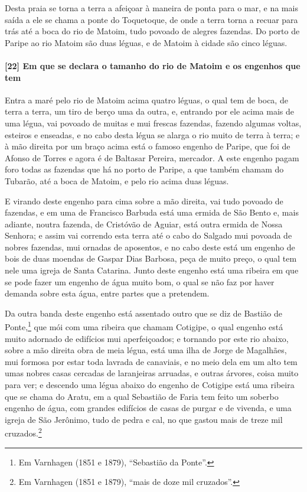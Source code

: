 \begin{linenumbers}
Desta praia se torna a terra a afeiçoar à maneira de ponta para o mar, e na mais saída a
ele se chama a ponte do Toquetoque, de onde a terra torna a recuar para trás até a boca do
rio de Matoim, tudo povoado de alegres fazendas. Do porto de Paripe ao rio Matoim são duas
léguas, e de Matoim à cidade são cinco léguas.

\paragraph{[22] Em que se declara o tamanho do rio de Matoim e os engenhos que tem}\quad
Entra a maré pelo rio de Matoim acima quatro léguas, o qual tem de boca, de terra a terra,
um tiro de berço uma da outra, e, entrando por ele acima mais de uma légua, vai povoado de
muitas e mui frescas fazendas, fazendo algumas voltas, esteiros e enseadas, e no cabo
desta légua se alarga o rio muito de terra à terra; e à mão direita por um braço acima
está o famoso engenho de Paripe, que foi de Afonso de Torres e agora é de Baltasar
Pereira, mercador. A este engenho pagam foro todas as fazendas que há no porto de Paripe,
a que também chamam do Tubarão, até a boca de Matoim, e pelo rio acima duas léguas.

E virando deste engenho para cima sobre a mão direita, vai tudo povoado de fazendas, e em
uma de Francisco Barbuda está uma ermida de São Bento e, mais adiante, noutra fazenda, de
Cristóvão de Aguiar, está outra ermida de Nossa Senhora; e assim vai correndo esta terra
até o cabo do Salgado mui povoada de nobres fazendas, mui ornadas de aposentos, e no cabo
deste está um engenho de bois de duas moendas de Gaspar Dias Barbosa, peça de muito preço,
o qual tem nele uma igreja de Santa Catarina. Junto deste engenho está uma ribeira em que
se pode fazer um engenho de água muito bom, o qual se não faz por haver demanda sobre esta
água, entre partes que a pretendem.

Da outra banda deste engenho está assentado outro que se diz de Bastião de
Ponte,\footnote{ Em Varnhagen (1851 e 1879), ``Sebastião da Ponte''.} que mói com uma
ribeira que chamam Cotigipe, o qual engenho está muito adornado de edifícios mui
aperfeiçoados; e tornando por este rio abaixo, sobre a mão direita obra de meia légua,
está uma ilha de Jorge de Magalhães, mui formosa por estar toda lavrada de canaviais, e no
meio dela em um alto tem umas nobres casas cercadas de laranjeiras arruadas, e outras
árvores, coisa muito para ver; e descendo uma légua abaixo do engenho de Cotigipe está uma
ribeira que se chama do Aratu, em a qual Sebastião de Faria tem feito um soberbo engenho
de água, com grandes edifícios de casas de purgar e de vivenda, e uma igreja de São
Jerônimo, tudo de pedra e cal, no que gastou mais de treze mil cruzados.\footnote{ Em
Varnhagen (1851 e 1879), ``mais de doze mil cruzados''.}


\end{linenumbers}
